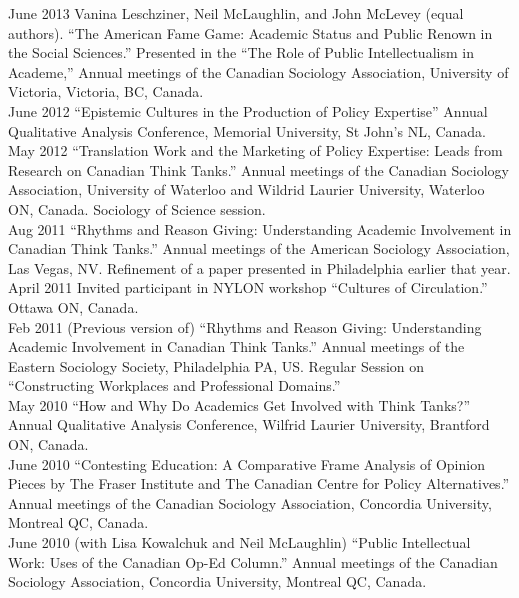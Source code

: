 \documentclass[9pt,usenames,dvipsnames]{article}
\begin{document}
\ind June 2013 Vanina Leschziner, Neil McLaughlin, and John McLevey (equal authors). ``The American Fame Game: Academic Status and Public Renown in the Social Sciences.'' Presented in the ``The Role of Public Intellectualism in Academe,'' Annual meetings of the Canadian Sociology Association, University of Victoria, Victoria, BC, Canada. \\

\ind June 2012 ``Epistemic Cultures in the Production of Policy Expertise'' Annual Qualitative Analysis Conference, Memorial University, St John's NL, Canada.\\

\ind May 2012 ``Translation Work and the Marketing of Policy Expertise: Leads from Research on Canadian Think Tanks.'' Annual meetings of the Canadian Sociology Association, University of Waterloo and Wildrid Laurier University, Waterloo ON, Canada. Sociology of Science session.\\

\ind Aug 2011 ``Rhythms and Reason Giving: Understanding Academic Involvement in Canadian Think Tanks.'' Annual meetings of the American Sociology Association, Las Vegas, NV. Refinement of a paper presented in Philadelphia earlier that year. \\

\ind April 2011 Invited participant in NYLON workshop ``Cultures of Circulation.'' Ottawa ON, Canada.\\

\ind Feb 2011 (Previous version of) ``Rhythms and Reason Giving: Understanding Academic Involvement in Canadian Think Tanks.'' Annual meetings of the Eastern Sociology Society, Philadelphia PA, US. Regular Session on ``Constructing Workplaces and Professional Domains.''\\

\ind May 2010 ``How and Why Do Academics Get Involved with Think Tanks?'' Annual Qualitative Analysis Conference, Wilfrid Laurier University, Brantford ON, Canada.\\

\ind June 2010 ``Contesting Education: A Comparative Frame Analysis of Opinion Pieces by The Fraser Institute and The Canadian Centre for Policy Alternatives.'' Annual meetings  of the Canadian Sociology Association, Concordia University, Montreal QC, Canada.\\

\ind June 2010 (with Lisa Kowalchuk and Neil McLaughlin) ``Public Intellectual Work: Uses of the Canadian Op-Ed Column.'' Annual meetings of the Canadian Sociology Association, Concordia University, Montreal QC, Canada.\\
\end{document}
